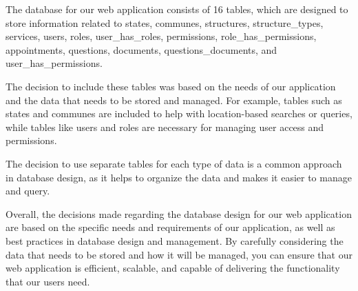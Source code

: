 The database for our web application consists of 16 tables, which are designed to store information related to states, communes, structures, structure\_types, services, users, roles, user\_has\_roles, permissions, role\_has\_permissions, appointments, questions, documents, questions\_documents, and user\_has\_permissions.

The decision to include these tables was  based on the needs of our application and the data that needs to be stored and managed. For example, tables such as states and communes are  included to help with location-based searches or queries, while tables like users and roles are necessary for managing user access and permissions.

The decision to use separate tables for each type of data is a common approach in database design, as it helps to organize the data and makes it easier to manage and query.

Overall, the decisions made regarding the database design for our web application are  based on the specific needs and requirements of our application, as well as best practices in database design and management. By carefully considering the data that needs to be stored and how it will be managed, you can ensure that our web application is efficient, scalable, and capable of delivering the functionality that our users need.